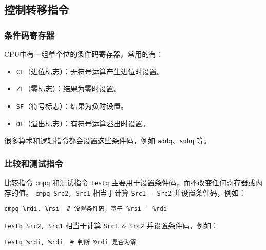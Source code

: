 \subsection{控制转移指令}
\subsubsection{条件码寄存器}
CPU中有一组单个位的条件码寄存器，常用的有：
\begin{itemize}
    \item \texttt{CF}（进位标志）：无符号运算产生进位时设置。
    \item \texttt{ZF}（零标志）：结果为零时设置。
    \item \texttt{SF}（符号标志）：结果为负时设置。
    \item \texttt{OF}（溢出标志）：有符号运算溢出时设置。
\end{itemize}
很多算术和逻辑指令都会设置这些条件码，例如 \texttt{addq}、\texttt{subq} 等。

\subsubsection{比较和测试指令}
比较指令 \texttt{cmpq} 和测试指令 \texttt{testq} 主要用于设置条件码，而不改变任何寄存器或内存的值。
\texttt{cmpq Src2, Src1} 相当于计算 \texttt{Src1 - Src2} 并设置条件码，例如：
\begin{verbatim}
cmpq %rdi, %rsi  # 设置条件码，基于 %rsi - %rdi
\end{verbatim}
\texttt{testq Src2, Src1} 相当于计算 \texttt{Src1 & Src2} 并设置条件码，例如：
\begin{verbatim}
testq %rdi, %rdi  # 判断 %rdi 是否为零
\end{verbatim}

